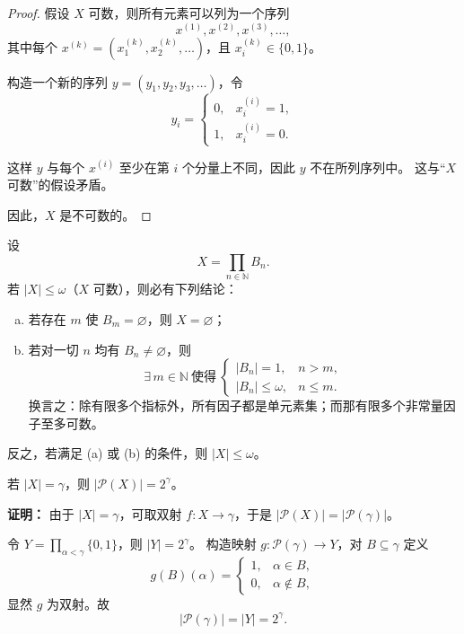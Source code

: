 \begin{proof}
假设 $X$ 可数，则所有元素可以列为一个序列
\[
x^{(1)}, x^{(2)}, x^{(3)}, \dots,
\]
其中每个 $x^{(k)} = (x^{(k)}_1, x^{(k)}_2, \dots)$，且 $x^{(k)}_i \in \{0,1\}$。

构造一个新的序列 $y = (y_1,y_2,y_3,\dots)$，令
\[
y_i =
\begin{cases}
0, & x^{(i)}_i = 1, \\
1, & x^{(i)}_i = 0.
\end{cases}
\]

这样 $y$ 与每个 $x^{(i)}$ 至少在第 $i$ 个分量上不同，因此 $y$ 不在所列序列中。  
这与“$X$ 可数”的假设矛盾。

因此，$X$ 是不可数的。
\end{proof}
\begin{proposition}
设
\[
X=\prod_{n\in\mathbb N} B_n .
\]
若 $|X|\le \omega$（$X$ 可数），则必有下列结论：
\begin{enumerate}[(a)]
  \item 若存在 $m$ 使 $B_m=\varnothing$，则 $X=\varnothing$；
  \item 若对一切 $n$ 均有 $B_n\ne\varnothing$，则
  \[
  \exists\, m\in\mathbb N\ \text{使得}\ 
  \begin{cases}
    |B_n|=1, & n>m,\\
    |B_n|\le \omega, & n\le m.
  \end{cases}
  \]
  换言之：除有限多个指标外，所有因子都是单元素集；而那有限多个非常量因子至多可数。
\end{enumerate}
反之，若满足 (a) 或 (b) 的条件，则 $|X|\le \omega$。
\end{proposition}
\begin{example}
若 $|X|=\gamma$，则 $|\mathcal{P}(X)|=2^\gamma$。

\textbf{证明：}  
由于 $|X|=\gamma$，可取双射 $f:X \to \gamma$，于是 $|\mathcal{P}(X)|=|\mathcal{P}(\gamma)|$。

令 $Y=\prod_{\alpha<\gamma}\{0,1\}$，则 $|Y|=2^\gamma$。  
构造映射 $g:\mathcal{P}(\gamma)\to Y$，对 $B\subseteq\gamma$ 定义
\[
g(B)(\alpha) =
\begin{cases}
1, & \alpha \in B,\\
0, & \alpha \notin B,
\end{cases}
\]
显然 $g$ 为双射。故
\[
|\mathcal{P}(\gamma)| = |Y| = 2^\gamma.
\]
\end{example}
